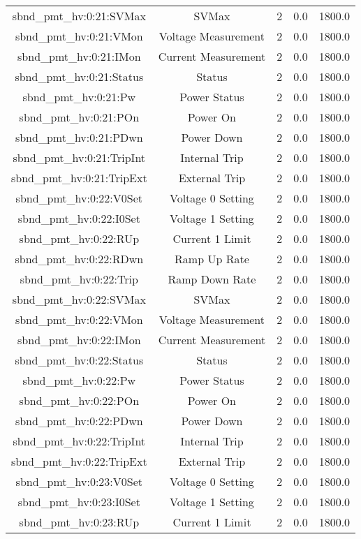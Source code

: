 \begin{table}[ptb]
\begin{tabular}{c | c c c c}
sbnd_pmt_hv:0:21:SVMax & SVMax & 2 & 0.0 & 1800.0\\ 
sbnd_pmt_hv:0:21:VMon & Voltage Measurement & 2 & 0.0 & 1800.0\\ 
sbnd_pmt_hv:0:21:IMon & Current Measurement & 2 & 0.0 & 1800.0\\ 
sbnd_pmt_hv:0:21:Status & Status & 2 & 0.0 & 1800.0\\ 
sbnd_pmt_hv:0:21:Pw & Power Status & 2 & 0.0 & 1800.0\\ 
sbnd_pmt_hv:0:21:POn & Power On & 2 & 0.0 & 1800.0\\ 
sbnd_pmt_hv:0:21:PDwn & Power Down & 2 & 0.0 & 1800.0\\ 
sbnd_pmt_hv:0:21:TripInt & Internal Trip & 2 & 0.0 & 1800.0\\ 
sbnd_pmt_hv:0:21:TripExt & External Trip & 2 & 0.0 & 1800.0\\ 
sbnd_pmt_hv:0:22:V0Set & Voltage 0 Setting & 2 & 0.0 & 1800.0\\ 
sbnd_pmt_hv:0:22:I0Set & Voltage 1 Setting & 2 & 0.0 & 1800.0\\ 
sbnd_pmt_hv:0:22:RUp & Current 1 Limit & 2 & 0.0 & 1800.0\\ 
sbnd_pmt_hv:0:22:RDwn & Ramp Up Rate & 2 & 0.0 & 1800.0\\ 
sbnd_pmt_hv:0:22:Trip & Ramp Down Rate & 2 & 0.0 & 1800.0\\ 
sbnd_pmt_hv:0:22:SVMax & SVMax & 2 & 0.0 & 1800.0\\ 
sbnd_pmt_hv:0:22:VMon & Voltage Measurement & 2 & 0.0 & 1800.0\\ 
sbnd_pmt_hv:0:22:IMon & Current Measurement & 2 & 0.0 & 1800.0\\ 
sbnd_pmt_hv:0:22:Status & Status & 2 & 0.0 & 1800.0\\ 
sbnd_pmt_hv:0:22:Pw & Power Status & 2 & 0.0 & 1800.0\\ 
sbnd_pmt_hv:0:22:POn & Power On & 2 & 0.0 & 1800.0\\ 
sbnd_pmt_hv:0:22:PDwn & Power Down & 2 & 0.0 & 1800.0\\ 
sbnd_pmt_hv:0:22:TripInt & Internal Trip & 2 & 0.0 & 1800.0\\ 
sbnd_pmt_hv:0:22:TripExt & External Trip & 2 & 0.0 & 1800.0\\ 
sbnd_pmt_hv:0:23:V0Set & Voltage 0 Setting & 2 & 0.0 & 1800.0\\ 
sbnd_pmt_hv:0:23:I0Set & Voltage 1 Setting & 2 & 0.0 & 1800.0\\ 
sbnd_pmt_hv:0:23:RUp & Current 1 Limit & 2 & 0.0 & 1800.0\\ 

\end{tabular}
\end{table}

